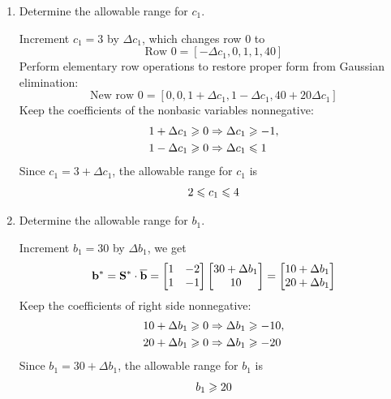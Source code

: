 \documentclass[a4paper]{article}
\begin{document}
\begin{enumerate}
\begin{enumerate}
	\item Determine the allowable range for $c_1$.
	\begin{solution}
		Increment $c_1=3$ by $\Delta c_1$, which changes row 0 to
		\begin{equation*}
		\text{Row 0}=[-\Delta c_1,0,1,1,40]
		\end{equation*}
		Perform elementary row operations to restore proper form from Gaussian elimination:
		\begin{equation*}
			\text{New row 0}=[0,0,1+\Delta c_1,1-\Delta c_1,40+20\Delta c_1]
		\end{equation*}
		Keep the coefficients of the nonbasic variables nonnegative:
		\begin{equation*}
		\begin{aligned}
		1+\Delta c_1\geqslant 0&\Rightarrow\Delta c_1\geqslant-1,\\
		1-\Delta c_1\geqslant 0&\Rightarrow\Delta c_1\leqslant 1\\
		\end{aligned}
		\end{equation*}
		Since $c_1=3+\Delta c_1$, the allowable range for $c_1$ is
		\begin{equation*}
		2\leqslant c_1 \leqslant 4
		\end{equation*}
	\end{solution}	
\vspace*{-0.5cm}	
	\item Determine the allowable range for $b_1$.
	\begin{solution}
		Increment $b_1=30$ by $\Delta b_1$, we get
		\begin{equation*}
		\mathbf{b}^*=\mathbf{S}^*\cdot\overline{\mathbf{b}}=\begin{bmatrix}
		1&-2\\
		1&-1\\
		\end{bmatrix}\begin{bmatrix}
		30+\Delta b_1\\
		10\\
		\end{bmatrix}
		=\begin{bmatrix}
		10+\Delta b_1\\
		20+\Delta b_1\\
		\end{bmatrix}
		\end{equation*}
		Keep the coefficients of right side nonnegative:
		\begin{equation*}
		\begin{aligned}
		10+\Delta b_1\geqslant 0&\Rightarrow\Delta b_1\geqslant -10,\\
		20+\Delta b_1\geqslant 0&\Rightarrow\Delta b_1\geqslant  -20\\
		\end{aligned}		
		\end{equation*}
		Since $b_1=30+\Delta b_1$, the allowable range for $b_1$ is
		\begin{equation*}
		b_1\geqslant 20
		\end{equation*}
	\end{solution}
\end{enumerate}

\end{enumerate}
\end{document}
